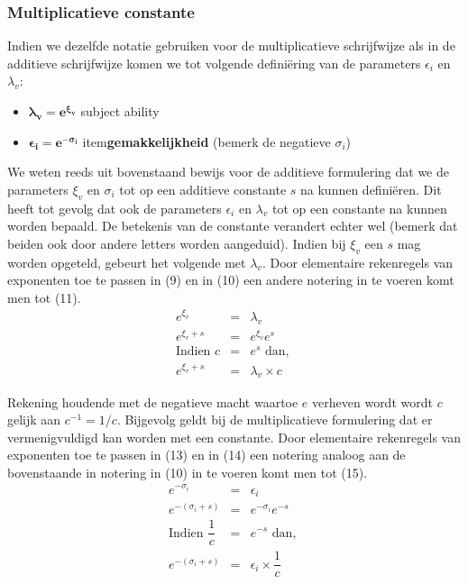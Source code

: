 \documentclass[11pt]{report}
\begin{document}
\subsubsection*{Multiplicatieve constante}
Indien we dezelfde notatie gebruiken voor de multiplicatieve schrijfwijze als in de additieve schrijfwijze komen we tot volgende defini\"ering van de parameters $\epsilon_{i}$ en $\lambda_{v}$:
\begin{itemize}
\item $\mathbf{\bm\lambda_{v}=e^{\bm\xi_{v}}}$ subject ability
\item $\mathbf{\bm\epsilon_{i}=e^{-\bm\sigma_{i}}}$ item\textbf{gemakkelijkheid} (bemerk de negatieve $\sigma_{i}$)
\end{itemize}

We weten reeds uit bovenstaand bewijs voor de additieve formulering dat we de parameters $\xi_{v}$ en $\sigma_{i}$ tot op een additieve constante  $s$  na kunnen defini\"eren. Dit heeft tot gevolg dat ook de parameters  $\epsilon_{i}$ en $\lambda_{v}$ tot op een constante na kunnen worden bepaald. De betekenis van de constante verandert echter wel (bemerk dat beiden ook door andere letters worden aangeduid).
Indien bij $\xi_{v}$ een $s$ mag worden opgeteld, gebeurt het volgende met $\lambda_{v}$. Door elementaire rekenregels van exponenten toe te passen in (9) en in (10) een andere notering in te voeren komt men tot (11).
\begin{eqnarray}
e^{\xi_{v}}&=&\lambda_{v}\\
e^{\xi_{v}+s}&=& e^{\xi_{v}}e^{s}\\
\text{Indien  } c&=&e^{s} \text{  dan, } \\
e^{\xi_{v}+s}&=& \lambda_{v}\times c
\end{eqnarray}

Rekening houdende met de negatieve macht waartoe $e$ verheven wordt wordt $c$ gelijk aan $c^{-1}=1/c$. Bijgevolg geldt bij de multiplicatieve formulering dat er vermenigvuldigd kan worden met een constante. Door elementaire rekenregels van exponenten toe te passen in (13) en in (14) een notering analoog aan de bovenstaande in notering in (10) in te voeren komt men tot (15).
\begin{eqnarray}
e^{-\sigma_{i}}&=&\epsilon_{i}\\
e^{-(\sigma_{i}+s)}&=& e^{-\sigma_{i}}e^{-s}\\
\text{Indien  } \dfrac{1}{c} &=&e^{-s} \text{  dan, } \\
e^{-(\sigma_{i}+s)}&=& \epsilon_{i} \times \dfrac{1}{c}
\end{eqnarray}
\end{document}
